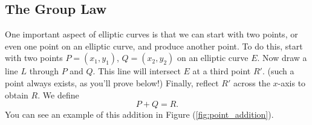 \documentclass{article}
\begin{document}
\subsection*{The Group Law}
    One important aspect of elliptic curves is that we can start with two points, or even one point on an elliptic curve, and produce another point. To do this, start with two points $P = (x_{1}, y_{1})$, $Q = (x_{2}, y_{2})$ on an elliptic curve $E$. Now draw a line $L$ through $P$ and $Q$. This line will intersect $E$ at a third point $R'$. (such a point always exists, as you'll prove below!) Finally, reflect $R'$ across the $x$-axis to obtain $R$. We define $$P + Q = R.$$ You can see an example of this addition in Figure (\ref{fig:point_addition}).

\begin{figure}[htbp]
    \centering
    

\end{figure}
\end{document}
